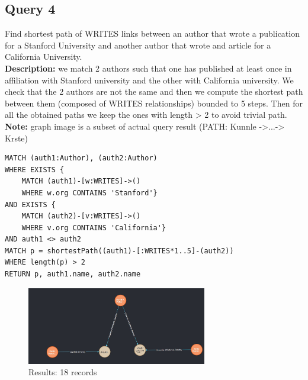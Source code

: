 \documentclass{Configuration_Files/PoliMi3i_thesis}
\begin{document}
\subsection{Query 4}
Find shortest path of WRITES links between an author that wrote a publication for a Stanford University and another author
that wrote and article for a California University.\\
\textbf{Description:} we match 2 authors such that one has published at least once in affiliation with Stanford university and the other with California university.
We check that the 2 authors are not the same and then we compute the shortest path between them (composed of WRITES relationships) bounded to 5 steps.
Then for all the obtained paths we keep the ones with length > 2 to avoid trivial path.\\
\textbf{Note:} graph image is a subset of actual query result (PATH: Kunnle ->...-> Krste)
\begin{lstlisting}[language=cypher, label=lst:cypher-example]
MATCH (auth1:Author), (auth2:Author)
WHERE EXISTS {
    MATCH (auth1)-[w:WRITES]->()
    WHERE w.org CONTAINS 'Stanford'}
AND EXISTS {
    MATCH (auth2)-[v:WRITES]->()
    WHERE v.org CONTAINS 'California'}
AND auth1 <> auth2
MATCH p = shortestPath((auth1)-[:WRITES*1..5]-(auth2))
WHERE length(p) > 2
RETURN p, auth1.name, auth2.name
\end{lstlisting}
\begin{figure}[H]
\centering
\includegraphics[width=0.7\textwidth]{query/query4.jpeg}
\caption{Results: 18 records}
\label{fig:query4}
\end{figure}
\end{document}
